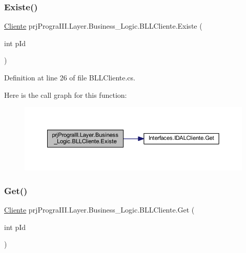 \subsubsection{\texorpdfstring{Existe()}{Existe()}}
{\footnotesize\ttfamily \hyperlink{classprj_progra_i_i_i_1_1_layer_1_1_entities_1_1_cliente}{Cliente} prj\+Progra\+I\+I\+I.\+Layer.\+Business\+\_\+\+Logic.\+B\+L\+L\+Cliente.\+Existe (\begin{DoxyParamCaption}\item[{int}]{p\+Id }\end{DoxyParamCaption})}



Definition at line 26 of file B\+L\+L\+Cliente.\+cs.

Here is the call graph for this function\+:
\nopagebreak
\begin{figure}[H]
\begin{center}
\leavevmode
\includegraphics[width=350pt]{classprj_progra_i_i_i_1_1_layer_1_1_business___logic_1_1_b_l_l_cliente_a6a228925ac2fdaf460a0921a58a80df4_cgraph}
\end{center}
\end{figure}
\hypertarget{classprj_progra_i_i_i_1_1_layer_1_1_business___logic_1_1_b_l_l_cliente_abdfaa80f94058237b31fb8599bedd86c}{}\label{classprj_progra_i_i_i_1_1_layer_1_1_business___logic_1_1_b_l_l_cliente_abdfaa80f94058237b31fb8599bedd86c} 
\subsubsection{\texorpdfstring{Get()}{Get()}}
{\footnotesize\ttfamily \hyperlink{classprj_progra_i_i_i_1_1_layer_1_1_entities_1_1_cliente}{Cliente} prj\+Progra\+I\+I\+I.\+Layer.\+Business\+\_\+\+Logic.\+B\+L\+L\+Cliente.\+Get (\begin{DoxyParamCaption}\item[{int}]{p\+Id }\end{DoxyParamCaption})}



